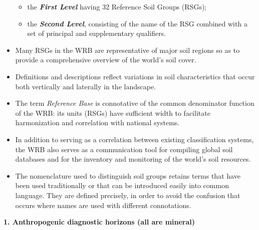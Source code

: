 \documentclass[
  letterpaper,
  DIV=11,
  numbers=noendperiod]{scrreprt}
\providecommand{\tightlist}{%
  \setlength{\itemsep}{0pt}\setlength{\parskip}{0pt}}\usepackage{longtable,booktabs,array}
\begin{document}
\begin{itemize}
  \begin{itemize}
  \tightlist
  \item
    the \textbf{\emph{First Level}} having 32 Reference Soil Groups
    (RSGs);
  \item
    the \textbf{\emph{Second Level}}, consisting of the name of the RSG
    combined with a set of principal and supplementary qualifiers.
  \end{itemize}
\item
  Many RSGs in the WRB are representative of major soil regions so as to
  provide a comprehensive overview of the world's soil cover.
\item
  Definitions and descriptions reflect variations in soil
  characteristics that occur both vertically and laterally in the
  landscape.
\item
  The term \emph{Reference Base} is connotative of the common
  denominator function of the WRB: its units (RSGs) have sufficient
  width to facilitate harmonization and correlation with national
  systems.
\item
  In addition to serving as a correlation between existing
  classification systems, the WRB also serves as a communication tool
  for compiling global soil databases and for the inventory and
  monitoring of the world's soil resources.
\item
  The nomenclature used to distinguish soil groups retains terms that
  have been used traditionally or that can be introduced easily into
  common language. They are defined precisely, in order to avoid the
  confusion that occurs where names are used with different
  connotations.
\end{itemize}

\textbf{1. Anthropogenic diagnostic horizons (all are mineral)}
\end{document}
